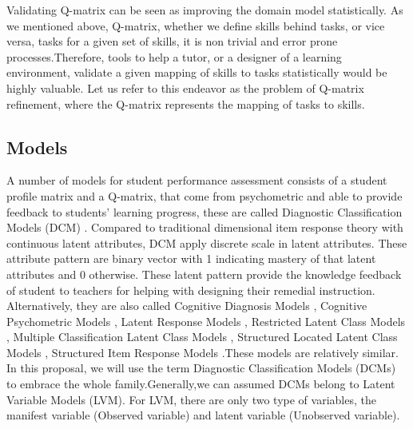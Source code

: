 \documentclass[12pt]{article}
\begin{document}
  Validating Q-matrix can be seen as improving the domain model statistically. As we mentioned above, Q-matrix, whether we define skills behind tasks, or vice versa, tasks for a given set of skills, it is non trivial and error prone processes.Therefore, tools to help a tutor, or a designer of a learning environment, validate a given mapping of skills to tasks statistically would be highly valuable. Let us refer to this endeavor as the problem of Q-matrix refinement, where the Q-matrix represents the mapping of tasks to skills.

\subsection{Models}
A number of models for student performance assessment consists of  a student profile matrix and a Q-matrix, that come from psychometric and able to provide feedback to students' learning progress, these are called Diagnostic Classification Models (DCM) \cite{templin2010diagnostic}. Compared to traditional dimensional item response theory with continuous latent attributes, DCM apply discrete scale in latent attributes. These attribute pattern are binary vector with 1 indicating  mastery of that latent attributes and 0 otherwise. These latent pattern provide the knowledge feedback of student to teachers for helping with designing their remedial instruction. Alternatively, they are also called Cognitive Diagnosis Models \cite{templin2006measurement}, Cognitive Psychometric Models \cite{rupp2007answer}, Latent Response Models \cite{maris1995psychometric}, Restricted Latent Class Models \cite{haertel1989using}, Multiple Classification Latent Class Models \cite{maris1999estimating}, Structured Located Latent Class Models \cite{xu2008fitting}, Structured Item Response Models \cite{rupp2007cognitive}.These models are relatively similar. In this proposal, we will use the term Diagnostic Classification Models (DCMs) to embrace the whole family.Generally,we can assumed DCMs belong to Latent Variable Models (LVM). For LVM, there are only two type of variables, the manifest variable (Observed variable) and latent variable (Unobserved variable).
\end{document}
